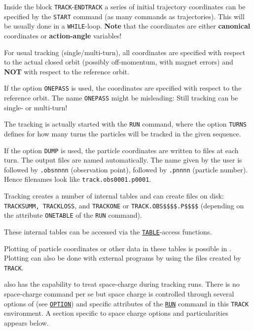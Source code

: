 Inside the block \texttt{TRACK}-\texttt{ENDTRACK} a series 
of initial trajectory coordinates can be specified by the \texttt{START} 
command (as many commands as trajectories). This will be usually done in a 
\texttt{WHILE}-loop. \textbf{Note} that the coordinates are either 
\textbf{canonical} coordinates or \textbf{action-angle} variables!

For usual tracking (single/multi-turn), all coordinates are specified
with respect to the actual closed orbit (possibly off-momentum, with
magnet errors) and \textbf{NOT} with respect to the reference orbit. 

If the option \texttt{ONEPASS} is used, the coordinates are specified
with respect to the reference orbit. The name \texttt{ONEPASS} might be
misleading: Still tracking can be single- or multi-turn!   

The tracking is actually started with the \texttt{RUN} command, where
the option \texttt{TURNS} defines for how many turns the particles will
be tracked in the given sequence. 

If the option \texttt{DUMP} is used, the particle coordinates are
written to files at each turn. The output files are named
automatically. The name given by the user is followed by
\texttt{.obsnnnn} (observation point), followed by
\texttt{.pnnnn} (particle number).\\
Hence filenames look like \texttt{track.obs0001.p0001}.  

Tracking creates a number of internal tables and can create files on disk: 
\texttt{TRACKSUMM, TRACKLOSS}, and \texttt{TRACKONE} or
\texttt{TRACK.OBS\$\$\$\$.P\$\$\$\$} (depending on the attribute
\texttt{ONETABLE} of the \texttt{RUN} command).

These internal tables can be accessed via the
\hyperref[chap:tables]{\texttt{TABLE}}-access functions.

Plotting of particle coordinates or other data in these tables is
possible in \madx. Plotting can also be done with external programs by
using the files created by \texttt{TRACK}.  

\madx also has the capability to treat space-charge during tracking
runs. There is no space-charge command per se but space charge is
controlled through several options of \madx (see
\hyperref[sec:option]{\texttt{OPTION}}) and specific attributes of the
\hyperref[sec:run]{\texttt{RUN}} command in this \texttt{TRACK} environment. A
section specific to space charge options and particularities appears
below.


